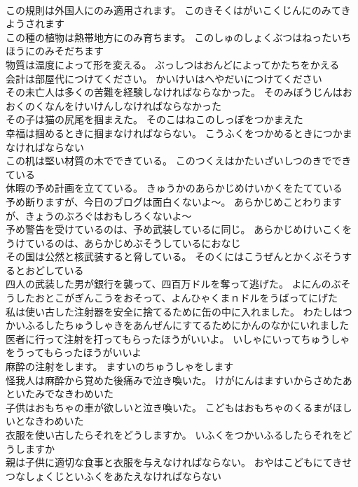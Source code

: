 \documentclass[8pt]{extreport}
\begin{document}
\begin{CJK}{UTF8}{min}
\\	この規則は外国人にのみ適用されます。	このきそくはがいこくじんにのみてきようされます 
\\	この種の植物は熱帯地方にのみ育ちます。	このしゅのしょくぶつはねったいちほうにのみそだちます 
\\	物質は温度によって形を変える。	ぶっしつはおんどによってかたちをかえる 
\\	会計は部屋代につけてください。	かいけいはへやだいにつけてください 
\\	その未亡人は多くの苦難を経験しなければならなかった。	そのみぼうじんはおおくのくなんをけいけんしなければならなかった 
\\	その子は猫の尻尾を掴まえた。	そのこはねこのしっぽをつかまえた 
\\	幸福は掴めるときに掴まなければならない。	こうふくをつかめるときにつかまなければならない 
\\	この机は堅い材質の木でできている。	このつくえはかたいざいしつのきでできている 
\\	休暇の予め計画を立てている。	きゅうかのあらかじめけいかくをたてている 
\\	予め断りますが、今日のブログは面白くないよ～。	あらかじめことわりますが、きょうのぶろぐはおもしろくないよ～ 
\\	予め警告を受けているのは、予め武装しているに同じ。	あらかじめけいこくをうけているのは、あらかじめぶそうしているにおなじ 
\\	その国は公然と核武装すると脅している。	そのくにはこうぜんとかくぶそうするとおどしている 
\\	四人の武装した男が銀行を襲って、四百万ドルを奪って逃げた。	よにんのぶそうしたおとこがぎんこうをおそって、よんひゃくまｎドルをうばってにげた 
\\	私は使い古した注射器を安全に捨てるために缶の中に入れました。	わたしはつかいふるしたちゅうしゃきをあんぜんにすてるためにかんのなかにいれました 
\\	医者に行って注射を打ってもらったほうがいいよ。	いしゃにいってちゅうしゃをうってもらったほうがいいよ 
\\	麻酔の注射をします。	ますいのちゅうしゃをします 
\\	怪我人は麻酔から覚めた後痛みで泣き喚いた。	けがにんはますいからさめたあといたみでなきわめいた 
\\	子供はおもちゃの車が欲しいと泣き喚いた。	こどもはおもちゃのくるまがほしいとなきわめいた 
\\	衣服を使い古したらそれをどうしますか。	いふくをつかいふるしたらそれをどうしますか 
\\	親は子供に適切な食事と衣服を与えなければならない。	おやはこどもにてきせつなしょくじといふくをあたえなければならない 

\end{CJK}
\end{document}
